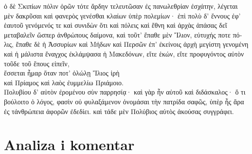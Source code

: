 {\large

\begin{greek}

\noindent  ὁ δὲ Σκιπίων πόλιν ὁρῶν τότε ἄρδην τελευτῶσαν ἐς πανωλεθρίαν ἐσχάτην, λέγεται μὲν δακρῦσαι καὶ φανερὸς γενέσθαι κλαίων ὑπὲρ πολεμίων· ἐπὶ πολὺ δ' ἔννους ἐφ' ἑαυτοῦ γενόμενός τε καὶ συνιδὼν ὅτι καὶ πόλεις καὶ ἔθνη καὶ ἀρχὰς ἁπάσας δεῖ μεταβαλεῖν ὥσπερ ἀνθρώπους δαίμονα, καὶ τοῦτ' ἔπαθε μὲν Ἴλιον, εὐτυχής ποτε πόλις, ἔπαθε δὲ ἡ Ἀσσυρίων καὶ Μήδων καὶ Περσῶν ἐπ' ἐκείνοις ἀρχὴ μεγίστη γενομένη καὶ ἡ μάλιστα ἔναγχος ἐκλάμψασα ἡ Μακεδόνων, εἴτε ἑκών, εἴτε προφυγόντος αὐτὸν τοῦδε τοῦ ἔπους εἰπεῖν,\\
\tabto{2em} ἔσσεται ἦμαρ ὅταν ποτ' ὀλώλῃ Ἴλιος ἱρὴ\\
\tabto{2em} καὶ Πρίαμος καὶ λαὸς ἐυμμελίω Πριάμοιο.\\
Πολυβίου δ' αὐτὸν ἐρομένου σὺν παρρησίᾳ· καὶ γὰρ ἦν αὐτοῦ καὶ διδάσκαλος· ὅ τι βούλοιτο ὁ λόγος, φασὶν οὐ φυλαξάμενον ὀνομάσαι τὴν πατρίδα σαφῶς, ὑπὲρ ἧς ἄρα ἐς τἀνθρώπεια ἀφορῶν ἐδεδίει. καὶ τάδε μὲν Πολύβιος αὐτὸς ἀκούσας συγγράφει.

\end{greek}

}


\section*{Analiza i komentar}


